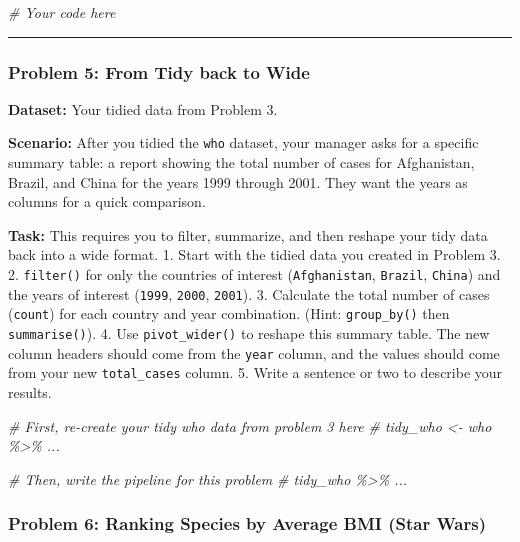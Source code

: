 \documentclass[
  11pt,
]{article}
\newenvironment{Shaded}{\begin{snugshade}}{\end{snugshade}}
\newcommand{\CommentTok}[1]{\textcolor[rgb]{0.56,0.35,0.01}{\textit{#1}}}
\begin{document}
\begin{Shaded}
\begin{Highlighting}[]
\CommentTok{\# Your code here}
\end{Highlighting}
\end{Shaded}

\begin{center}\rule{0.5\linewidth}{0.5pt}\end{center}

\subsubsection{Problem 5: From Tidy back to
Wide}\label{problem-5-from-tidy-back-to-wide}

\textbf{Dataset:} Your tidied data from Problem 3.

\textbf{Scenario:} After you tidied the \texttt{who} dataset, your
manager asks for a specific summary table: a report showing the total
number of cases for Afghanistan, Brazil, and China for the years 1999
through 2001. They want the years as columns for a quick comparison.

\textbf{Task:} This requires you to filter, summarize, and then reshape
your tidy data back into a wide format. 1. Start with the tidied data
you created in Problem 3. 2. \texttt{filter()} for only the countries of
interest (\texttt{Afghanistan}, \texttt{Brazil}, \texttt{China}) and the
years of interest (\texttt{1999}, \texttt{2000}, \texttt{2001}). 3.
Calculate the total number of cases (\texttt{count}) for each country
and year combination. (Hint: \texttt{group\_by()} then
\texttt{summarise()}). 4. Use \texttt{pivot\_wider()} to reshape this
summary table. The new column headers should come from the \texttt{year}
column, and the values should come from your new \texttt{total\_cases}
column. 5. Write a sentence or two to describe your results.

\begin{Shaded}
\begin{Highlighting}[]
\CommentTok{\# First, re{-}create your tidy \textquotesingle{}who\textquotesingle{} data from problem 3 here}
\CommentTok{\# tidy\_who \textless{}{-} who \%\textgreater{}\% ...}

\CommentTok{\# Then, write the pipeline for this problem}
\CommentTok{\# tidy\_who \%\textgreater{}\% ...}
\end{Highlighting}
\end{Shaded}

\subsubsection{Problem 6: Ranking Species by Average BMI (Star
Wars)}\label{problem-6-ranking-species-by-average-bmi-star-wars}
\end{document}
